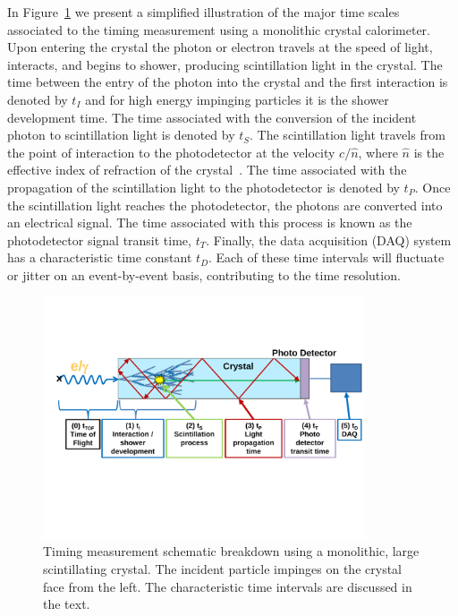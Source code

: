 In Figure~\ref{fig:ScintillatorTiming} we present a simplified illustration of
the major time scales associated to the timing measurement using a monolithic
crystal calorimeter. Upon entering the crystal the photon or electron travels
at the speed of light, interacts, and begins to shower, producing scintillation light in the crystal. 
The time between the entry of the photon into the crystal and the first interaction is denoted by
$t_I$ and for high energy impinging particles it is the shower development time. 
The time associated with the conversion of the incident photon to
scintillation light is denoted by $t_S$. The scintillation light travels from
the point of interaction to the photodetector at the velocity $c/\hat{n}$, where
$\hat{n}$ is the effective index of refraction of the crystal~\cite{Moses}. The
time associated with the propagation of the scintillation light to the photodetector 
is denoted by $t_P$. Once the scintillation light reaches the photodetector, the  photons 
are converted into an electrical signal. The time associated with this process is known as the
photodetector signal transit time, $t_T$. Finally, the data acquisition (DAQ)
system has a characteristic time constant $t_D$. Each of these time intervals will fluctuate or 
jitter on an event-by-event basis, contributing to the time resolution.


\begin{figure}[h] \centering
\includegraphics[width=0.85\textwidth]{figs/ScintillatorTiming_v4}
\caption{\small Timing measurement schematic breakdown using a monolithic, large scintillating crystal. 
The incident particle impinges on the crystal face from the left. The characteristic time intervals  are discussed 
in the text.}
\label{fig:ScintillatorTiming}
\end{figure}

